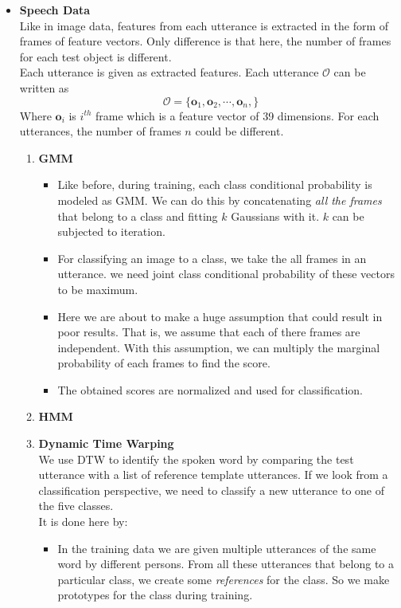 \documentclass[11pt,paper=a4,answers]{exam}
\newcommand{\Oh}{\bm{\mathcal{O}}}
\begin{document}
\begin{questions}
\begin{itemize}
    \item \textbf{Speech Data}\\
    Like in image data, features from each utterance is extracted in the form of frames of feature vectors. Only difference is that here, the number of frames for each test object is different.\\
    Each utterance is given as extracted features. Each utterance $\Oh$ can be written as 
    $$ \Oh = \{\bm{o}_1, \bm{o}_2, \cdots, \bm{o}_n, \}$$
    Where $\bm{o}_i$ is $i^{th}$ frame which is a feature vector of 39 dimensions. For each utterances, the number of frames $n$ could be different.
    \begin{enumerate}
        \item \textbf{GMM}
        \begin{itemize}
            \item Like before, during training, each class conditional probability is modeled as GMM. We can do this by concatenating \textit{all the frames} that belong to a class and fitting $k$ Gaussians with it. $k$ can be subjected to iteration.
            \item For classifying an image to a class, we take the all frames in an utterance. we need joint class conditional probability of these vectors to be maximum.
            \item Here we are about to make a huge assumption that could result in poor results. That is, we assume that each of there frames are independent. With this assumption, we can multiply the marginal probability of each frames to find the score.
            \item The obtained scores are normalized and used for classification.
        \end{itemize}
        \item \textbf{HMM}
        \item \textbf{Dynamic Time Warping}\\
            We use DTW to identify the spoken word by comparing the test utterance with a list of reference template utterances. If we look from a classification perspective, we need to classify a new utterance to one of the five classes.\\
            It is done here by:
            \begin{itemize}
                \item In the training data we are given multiple utterances of the same word by different persons. From all these utterances that belong to a particular class, we create some \textit{references} for the class. So we make prototypes for the class during training.

\end{itemize}
\end{enumerate}
\end{itemize}
\end{questions}
\end{document}
